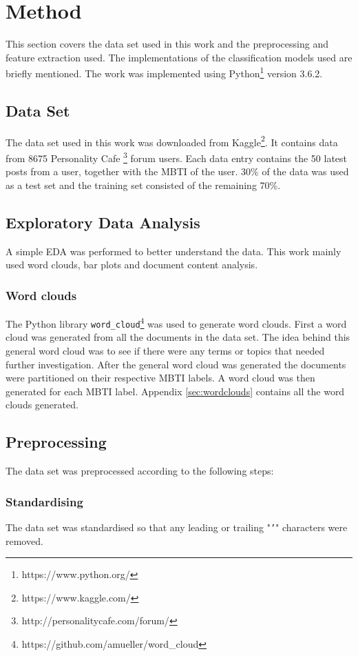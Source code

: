 \section{Method}

This section covers the data set used in this work and the preprocessing and feature extraction used.
The implementations of the classification models used are briefly mentioned.
The work was implemented using Python\footnote{https://www.python.org/} version 3.6.2.
\subsection{Data Set}
The data set used in this work was downloaded from Kaggle\footnote{https://www.kaggle.com/}.
It contains data from 8675 Personality Cafe \footnote{http://personalitycafe.com/forum/} forum users.
Each data entry contains the 50 latest posts from a user, together with the MBTI of the user.
30\% of the data was used as a test set and the training set consisted of the remaining 70\%.
\subsection{Exploratory Data Analysis}
A simple EDA was performed to better understand the data.
This work mainly used word clouds, bar plots and document content analysis.

\subsubsection{Word clouds}
The Python library \texttt{word\_cloud}\footnote{https://github.com/amueller/word\_cloud} was used to generate word clouds.
First a word cloud was generated from all the documents in the data set.
The idea behind this general word cloud was to see if there were any terms or topics that needed further investigation.
After the general word cloud was generated the documents were partitioned on their respective MBTI labels.
A word cloud was then generated for each MBTI label.
Appendix \ref{sec:wordclouds} contains all the word clouds generated.

\subsection{Preprocessing} \label{sec:method-preprocessing} 
The data set was preprocessed according to the following steps:

\subsubsection{Standardising}
The data set was standardised so that any leading or trailing "\texttt{'}" characters were removed.

